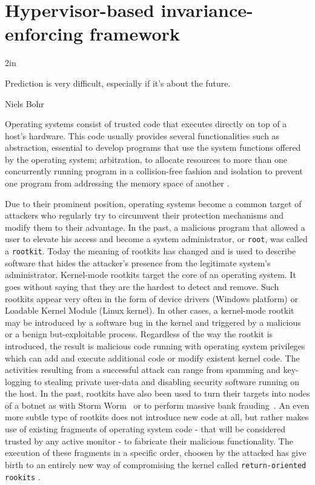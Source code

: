 \chapter{Hypervisor-based invariance-enforcing framework} \label{hellorootkitty}

\epigraph{2in}{Prediction is very difficult, especially if it's about the future.}{Niels Bohr}{}


Operating systems consist of trusted code that executes directly on top of a host's hardware. This code usually provides several functionalities such as abstraction, essential to develop programs that use the system functions offered by the operating system; arbitration, to allocate resources to more than one concurrently running program in a collision-free fashion and isolation to prevent one program from addressing the memory space of another \cite{stallings}.

Due to their prominent position, operating systems become a common target of attackers who regularly try to circumvent their protection mechanisms and modify them to their advantage. In the past, a malicious program that allowed a user to elevate his access and become a system administrator, or \texttt{root}, was called a \texttt{rootkit}. Today the meaning of rootkits has changed and is used to describe software that hides the attacker's presence from the legitimate system's administrator. 
Kernel-mode rootkits target the core of an operating system. It goes without saying that they are the hardest to detect and remove. Such rootkits appear very often in the form of device drivers (Windows platform) or Loadable Kernel Module (Linux kernel). 
In other cases, a kernel-mode rootkit may be introduced by a software bug in the kernel and  triggered by a malicious or a benign but-exploitable process.
Regardless of the way the rootkit is introduced, the result is malicious code running with operating system privileges which can add and execute additional code or modify existent kernel code. The activities resulting from a successful attack can range from spamming and key-logging to stealing private user-data and disabling security software running on the host.
In the past, rootkits have also been used to turn their targets into nodes of a botnet as with Storm Worm~\cite{1387718} or to perform massive bank frauding~\cite{mcaffee}.
An even more subtle type of rootkits does not introduce new code at all, but rather makes use of existing fragments of operating system code - that will be considered trusted by any active monitor - to fabricate their malicious functionality. The execution of these fragments in a specific order, choosen by the attacked has give birth to an entirely new way of compromising the kernel called \texttt{return-oriented rookits} \cite{Hund2009}. 

